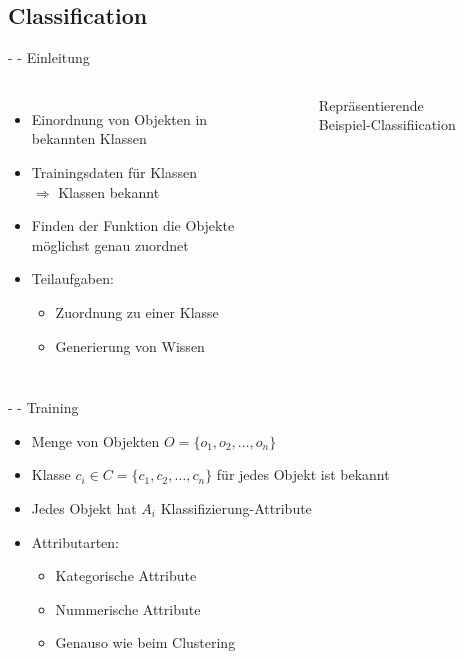 \documentclass[fleqn,11pt,aspectratio=43]{beamer}
\begin{document}
\subsection{Classification~}

\begin{frame}{\insertsectionhead - \insertsubsectionhead - Einleitung \cite{ester2000knowledge}}
\begin{columns}[onlytextwidth]
\begin{itemize}
\setlength{\itemsep}{10pt}
\item Einordnung von Objekten in bekannten Klassen
\item Trainingsdaten für Klassen \\$\Rightarrow$ Klassen bekannt
\item Finden der Funktion die Objekte möglichst genau zuordnet
\item Teilaufgaben:
\begin{itemize}
\item Zuordnung zu einer Klasse
\item Generierung von Wissen 
\end{itemize}
\end{itemize}
\begin{figure}
\scalebox{.6}{}
\caption{Repräsentierende Beispiel-Classifiication}
\end{figure}
\end{columns}

\end{frame}

\begin{frame}{\insertsectionhead - \insertsubsectionhead - Training \cite{ester2000knowledge}}
\begin{itemize}
\setlength{\itemsep}{10pt}
\item Menge von Objekten $O = \{o_1, o_2, \ldots, o_n\}$
\item Klasse $c_i \in C = \{c_1, c_2, \ldots, c_n\}$ für jedes Objekt ist bekannt
\item Jedes Objekt hat $A_i$ Klassifizierung-Attribute
\item Attributarten: \vspace{1em}
\begin{itemize}
\setlength{\itemsep}{10pt}
\item Kategorische Attribute
\item Nummerische Attribute
\item Genauso wie beim Clustering
\end{itemize}
\end{itemize}
\end{frame}
\end{document}
